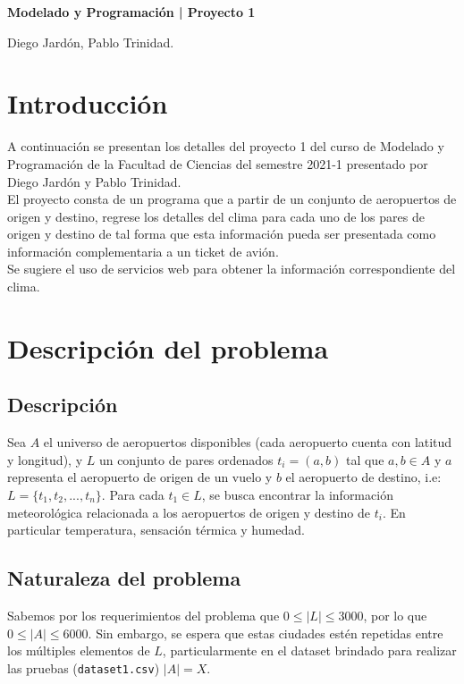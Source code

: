 \documentclass[10pt, letterpaper]{article}
\begin{document}
\begin{center}
    {\large \bfseries Modelado y Programación | Proyecto 1 \par}
    \vspace{0.2cm}
    Diego Jardón, Pablo Trinidad.
\end{center}

\section{Introducción}

A continuación se presentan los detalles del proyecto 1 del curso de Modelado y Programación
de la Facultad de Ciencias del semestre 2021-1 presentado por Diego Jardón y Pablo Trinidad.\\

El proyecto consta de un programa que a partir de un conjunto de aeropuertos de origen y destino,
regrese los detalles del clima para cada uno de los pares de origen y destino de tal forma que
esta información pueda ser presentada como información complementaria a un ticket de avión.\\

Se sugiere el uso de servicios web para obtener la información correspondiente del clima.

\section{Descripción del problema}

\subsection{Descripción}

Sea $A$ el universo de aeropuertos disponibles (cada aeropuerto cuenta con latitud y longitud),
y $L$ un conjunto de pares ordenados $t_i = (a, b)$ tal que $a, b \in A$ y $a$ representa
el aeropuerto de origen de un vuelo y $b$ el aeropuerto de destino, i.e:
$L = \{t_1, t_2, ..., t_n\}$. Para cada $t_1 \in L$, se busca encontrar la información meteorológica
relacionada a los aeropuertos de origen y destino de $t_i$. En particular temperatura, sensación
térmica y humedad.

\subsection{Naturaleza del problema}

Sabemos por los requerimientos del problema que $0 \leq |L| \leq 3000$, por lo que
$0 \leq |A| \leq 6000$. Sin embargo, se espera que estas ciudades estén repetidas entre los múltiples
elementos de $L$, particularmente en el dataset brindado para realizar las pruebas
(\texttt{dataset1.csv}) $|A|=X$.
\end{document}
